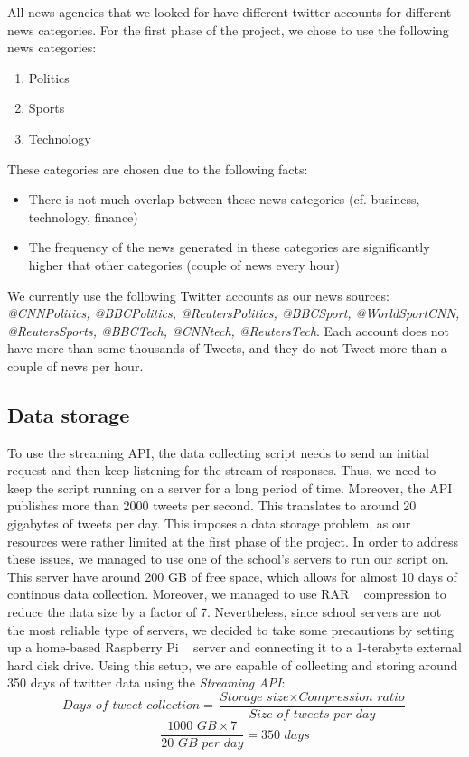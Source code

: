 \documentclass{llncs}
\begin{document}
All news agencies that we looked for have different twitter accounts for different news categories. For the first phase of the project, we chose to use the following news categories:

\begin{enumerate}
  \item Politics
  \item Sports
  \item Technology
\end{enumerate}

These categories are chosen due to the following facts:
\begin{itemize}
  \item There is not much overlap between these news categories (cf. business, technology, finance)
  \item The frequency of the news generated in these categories are significantly higher that other categories (couple of news every hour)
\end{itemize}

We currently use the following Twitter accounts as our news sources: \textit{@CNNPolitics, @BBCPolitics, @ReutersPolitics, @BBCSport, @WorldSportCNN, @ReutersSports, @BBCTech, @CNNtech, @ReutersTech}. Each account does not have more than some thousands of Tweets, and they do not Tweet more than a couple of news per hour.

\subsection{Data storage}
To use the streaming API, the data collecting script needs to send an initial request and then keep listening for the stream of responses. Thus, we need to keep the script running on a server for a long period of time. Moreover, the API publishes more than 2000 tweets per second. This translates to around 20 gigabytes of tweets per day. This imposes a data storage problem, as our resources were rather limited at the first phase of the project. In order to address these issues, we managed to use one of the school's servers to run our script on. This server have around 200 GB of free space, which allows for almost 10 days of continous data collection. Moreover, we managed to use RAR ~\cite{wiki:RAR} compression to reduce the data size by a factor of 7. Nevertheless, since school servers are not the most reliable type of servers, we decided to take some precautions by setting up a home-based Raspberry Pi ~\cite{wiki:raspberrypi} server and connecting it to a 1-terabyte external hard disk drive. Using this setup, we are capable of collecting and storing around 350 days of twitter data using the \textit{Streaming API}:
\[\textit{Days of tweet collection}=\frac{\textit{Storage size}\times \textit{Compression ratio}} {\textit{Size of tweets per day}}\]
\[\frac{\textit{1000 GB} \times 7}{\textit{20 GB per day}}=\textit{350 days} \]
\end{document}
